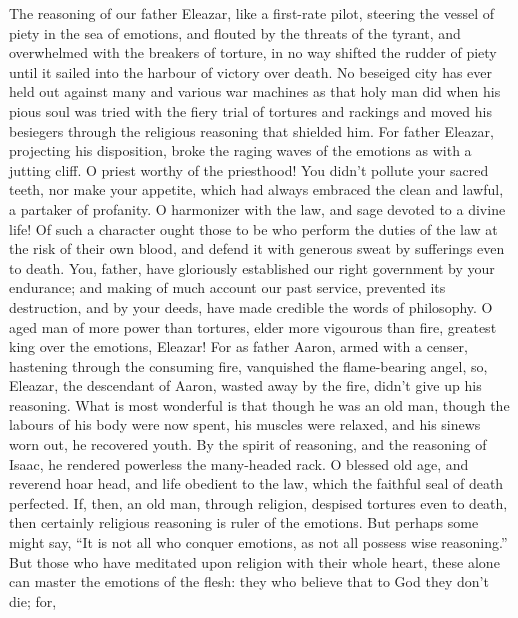  The reasoning of our father Eleazar, like a first-rate
pilot, steering the vessel of piety in the sea of emotions, 
and flouted by the threats of the tyrant, and overwhelmed with the
breakers of torture,  in no way shifted the rudder of piety
until it sailed into the harbour of victory over death.  No
beseiged city has ever held out against many and various war machines as
that holy man did when his pious soul was tried with the fiery trial of
tortures and rackings and moved his besiegers through the religious
reasoning that shielded him.  For father Eleazar, projecting
his disposition, broke the raging waves of the emotions as with a
jutting cliff.  O priest worthy of the priesthood! You
didn't pollute your sacred teeth, nor make your appetite, which had
always embraced the clean and lawful, a partaker of profanity.
 O harmonizer with the law, and sage devoted to a divine
life!  Of such a character ought those to be who perform the
duties of the law at the risk of their own blood, and defend it with
generous sweat by sufferings even to death.  You, father,
have gloriously established our right government by your endurance; and
making of much account our past service, prevented its destruction, and
by your deeds, have made credible the words of philosophy. 
O aged man of more power than tortures, elder more vigourous than fire,
greatest king over the emotions, Eleazar!  For as father
Aaron, armed with a censer, hastening through the consuming fire,
vanquished the flame-bearing angel,  so, Eleazar, the
descendant of Aaron, wasted away by the fire, didn't give up his
reasoning.  What is most wonderful is that though he was an
old man, though the labours of his body were now spent, his muscles were
relaxed, and his sinews worn out, he recovered youth.  By
the spirit of reasoning, and the reasoning of Isaac, he rendered
powerless the many-headed rack.  O blessed old age, and
reverend hoar head, and life obedient to the law, which the faithful
seal of death perfected.  If, then, an old man, through
religion, despised tortures even to death, then certainly religious
reasoning is ruler of the emotions.  But perhaps some might
say, ``It is not all who conquer emotions, as not all possess wise
reasoning.''  But those who have meditated upon religion
with their whole heart, these alone can master the emotions of the
flesh:  they who believe that to God they don't die; for,
